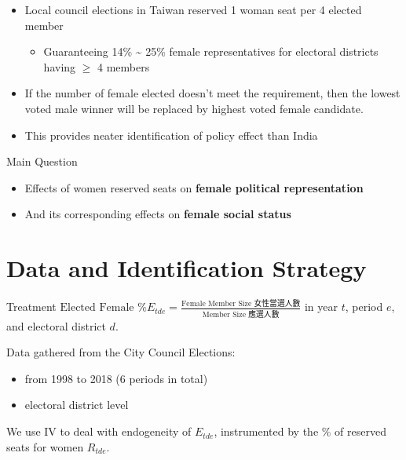 \documentclass[
  9pt,
  ignorenonframetext,
  aspectratio=43,
]{beamer}
\providecommand{\tightlist}{%
  \setlength{\itemsep}{0pt}\setlength{\parskip}{0pt}}
\begin{document}
\begin{frame}
\begin{itemize}
\tightlist
\item
  Local council elections in Taiwan reserved 1 woman seat per 4 elected
  member

  \begin{itemize}
  \tightlist
  \item
    Guaranteeing 14\% \textasciitilde{} 25\% female representatives for
    electoral districts having \(\geq\) 4 members
  \end{itemize}
\item
  If the number of female elected doesn't meet the requirement, then the
  lowest voted male winner will be replaced by highest voted female
  candidate.
\item
  This provides neater identification of policy effect than India
\end{itemize}
\end{frame}

\begin{frame}{Main Question}
\protect\hypertarget{main-question}{}
\begin{itemize}
\tightlist
\item
  Effects of women reserved seats on \textbf{female political
  representation}
\item
  And its corresponding effects on \textbf{female social status}
\end{itemize}
\end{frame}

\hypertarget{data-and-identification-strategy}{%
\section{Data and Identification
Strategy}\label{data-and-identification-strategy}}

\begin{frame}{Treatment}
\protect\hypertarget{treatment}{}
\(\text{Elected Female \% } E_{tde} = \frac{\text{Female Member Size 女性當選人數}}{\text{Member Size 應選人數}}\)
in year \(t\), period \(e\), and electoral district \(d\).

Data gathered from the City Council Elections:

\begin{itemize}
\tightlist
\item
  from 1998 to 2018 (6 periods in total)
\item
  electoral district level
\end{itemize}

We use IV to deal with endogeneity of \(E_{tde}\), instrumented by the
\% of reserved seats for women \(R_{tde}\).
\end{frame}
\end{document}
